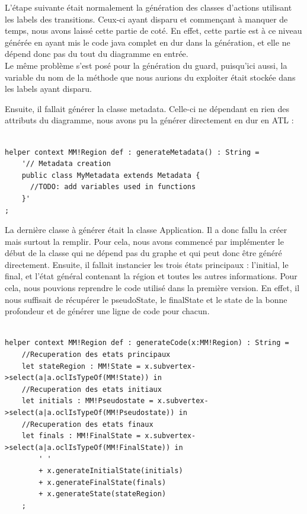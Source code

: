 \documentclass[french, 12pt, a4paper]{article}
\begin{document}
    L'étape suivante était normalement la génération des classes d'actions utilisant les labels des transitions. Ceux-ci ayant disparu et commençant à manquer de temps, nous avons laissé cette partie de coté. En effet, cette partie est à ce niveau générée en ayant mis le code java complet en dur dans la génération, et elle ne dépend donc pas du tout du diagramme en entrée.\\
    Le même problème s'est posé pour la génération du guard, puisqu'ici aussi, la variable du nom de la méthode que nous aurions du exploiter était stockée dans les labels ayant disparu.
    
    Ensuite, il fallait générer la classe metadata. Celle-ci ne dépendant en rien des attributs du diagramme, nous avons pu la générer directement en dur en ATL : 
    \begin{lstlisting}[caption={Génération de la classe metadata},basicstyle=\small]

helper context MM!Region def : generateMetadata() : String = 
    '// Metadata creation
    public class MyMetadata extends Metadata {
      //TODO: add variables used in functions
    }'
;
    \end{lstlisting}
    
    La dernière classe à générer était la classe Application. Il a donc fallu la créer mais surtout la remplir. Pour cela, nous avons commencé par implémenter le début de la classe qui ne dépend pas du graphe et qui peut donc être généré directement. Ensuite, il fallait instancier les trois états principaux : l'initial, le final, et l'état général contenant la région et toutes les autres informations. 
    Pour cela, nous pouvions reprendre le code utilisé dans la première version. En effet, il nous suffisait de récupérer le pseudoState, le finalState et le state de la bonne profondeur et de générer une ligne de code pour chacun.
    
        \begin{lstlisting}[caption={Extrait de la méthode récupérant les différents états et appelant la génération sur chacun},basicstyle=\small]
        
helper context MM!Region def : generateCode(x:MM!Region) : String = 
    //Recuperation des etats principaux
	let stateRegion : MM!State = x.subvertex->select(a|a.oclIsTypeOf(MM!State)) in
	//Recuperation des etats initiaux
	let initials : MM!Pseudostate = x.subvertex->select(a|a.oclIsTypeOf(MM!Pseudostate)) in
	//Recuperation des etats finaux
	let finals : MM!FinalState = x.subvertex->select(a|a.oclIsTypeOf(MM!FinalState)) in
		' ' 
		+ x.generateInitialState(initials)
		+ x.generateFinalState(finals)
		+ x.generateState(stateRegion)
	;
	    \end{lstlisting}
\end{document}
